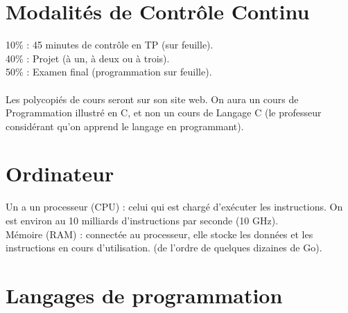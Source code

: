 \documentclass{article}
\begin{document}

\section{Modalités de Contrôle Continu}

10\% : 45 minutes de contrôle en TP (sur feuille).\\
40\% : Projet (à un, à deux ou à trois).\\
50\% : Examen final (programmation sur feuille).\\\\

\noindent Les polycopiés de cours seront sur son site web. On aura un cours de Programmation illustré en C, et non un cours de Langage C (le professeur considérant qu'on apprend le langage en programmant).\\

\section{Ordinateur}

Un a un processeur (CPU) : celui qui est chargé d'exécuter les instructions. On est environ au 10 milliards d'instructions par seconde (10 GHz).\\
Mémoire (RAM) : connectée au processeur, elle stocke les données et les instructions en cours d'utilisation. (de l'ordre de quelques dizaines de Go).\\


\section{Langages de programmation}
\end{document}
